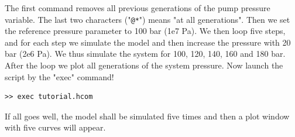 \documentclass[a4paper,pdftex]{article}
\begin{document}
\begin{enumerate}
The first command removes all previous generations of the pump pressure variable. The last two characters ("\texttt{@*}") means "at all generations". Then we set the reference pressure parameter to 100 bar (1e7 Pa). We then loop five steps, and for each step we simulate the model and then increase the pressure with 20 bar (2e6 Pa). We thus simulate the system for 100, 120, 140, 160 and 180 bar. After the loop we plot all generations of the system pressure. Now launch the script by the "exec" command!

\vspace{5pt}\hspace{10pt}
\begin{minipage}{0.5\linewidth}
\begin{verbatim}
>> exec tutorial.hcom
\end{verbatim}
\end{minipage}
\vspace{5pt}

If all goes well, the model shall be simulated five times and then a plot window with five curves will appear.
\end{enumerate}

%
%
\end{document}
